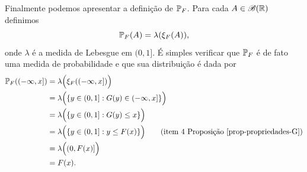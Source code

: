 Finalmente podemos apresentar a definição de $\P_F$.
Para cada $A\in \mathscr{B}(\R)$ definimos 
	\[
		\P_{F}(A) =\lambda(\xi_{F}(A)),
	\]
onde $\lambda$ é a medida de Lebesgue em $(0,1]$.
É simples verificar que $\P_F$ é de fato uma medida
de probabilidade e que sua distribuição é dada por
%
\begin{align*}
	\P_F((-\infty,x]) 
	&=
	\lambda \Big(\xi_{F}((-\infty,x])\Big)
	\\
	&=
	\lambda\Big( \{ y\in (0,1]: G(y)\in (-\infty,x] \} \Big)
	\\
	&=
	\lambda\Big( \{ y\in (0,1]: G(y)\leq x \} \Big)
	\\
	&=
	\lambda\Big( \{ y\in (0,1]: y\leq F(x) \} \Big)
	\qquad
	(\text{item 4 Proposição \ref{prop-propriedades-G}})
	\\
	&=
	\lambda\Big( (0,F(x)] \Big)
	\\
	&=
	F(x).
\end{align*}














